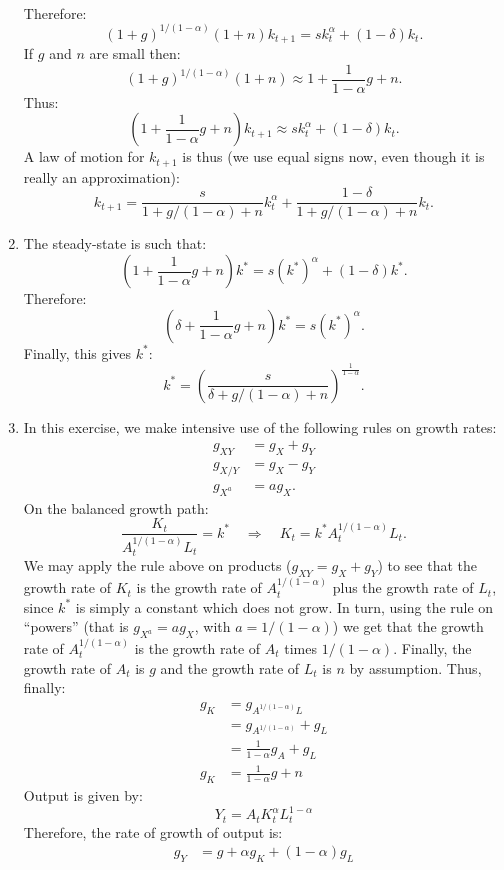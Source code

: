 \documentclass[]{book}
\theoremstyle{definition}
\theoremstyle{definition}
\theoremstyle{definition}
\theoremstyle{remark}
\begin{document}
\begin{enumerate}
\[\begin{aligned}
  \end{aligned}
  \] Therefore:
  \[(1+g)^{1/(1-\alpha)}(1+n) k_{t+1} =sk_t^\alpha+(1-\delta)k_t.\] If
  \(g\) and \(n\) are small then:
  \[(1+g)^{1/(1-\alpha)}(1+n)\approx1+\frac{1}{1-\alpha}g+n.\] Thus:
  \[\left(1+\frac{1}{1-\alpha}g+n\right)k_{t+1}\approx s k_t^\alpha+(1-\delta)k_t.\]
  A law of motion for \(k_{t+1}\) is thus (we use equal signs now, even
  though it is really an approximation):
  \[\boxed{k_{t+1}=\frac{s}{1+g/(1-\alpha)+n}k_t^{\alpha}+\frac{1-\delta}{1+g/(1-\alpha)+n}k_t}.\]
\item
  The steady-state is such that:
  \[\left(1+\frac{1}{1-\alpha}g+n\right)k^{*} = s(k^{*})^\alpha + (1-\delta)k^{*}.\]
  Therefore:
  \[\left(\delta+\frac{1}{1-\alpha}g+n\right)k^{*} = s(k^{*})^\alpha.\]
  Finally, this gives \(k^{*}\):
  \[\boxed{k^{*}=\left(\frac{s}{\delta+g/(1-\alpha)+n}\right)^{\frac{1}{1-\alpha}}}.\]
\item
  In this exercise, we make intensive use of the following rules on
  growth rates: \[
  \begin{aligned}
  g_{XY}&=g_X+g_Y\\
  g_{X/Y}&=g_X-g_Y\\
  g_{X^a}&=ag_X.
  \end{aligned}
  \] On the balanced growth path:
  \[\frac{K_t}{A_t^{1/(1-\alpha)} L_t}=k^{*} \quad \Rightarrow \quad K_t = k^{*}A_t^{1/(1-\alpha)} L_t.\]
  We may apply the rule above on products (\(g_{XY}=g_X+g_Y\)) to see
  that the growth rate of \(K_t\) is the growth rate of
  \(A_t^{1/(1-\alpha)}\) plus the growth rate of \(L_t\), since
  \(k^{*}\) is simply a constant which does not grow. In turn, using the
  rule on ``powers'' (that is \(g_{X^a}=ag_X\), with \(a=1/(1-\alpha)\))
  we get that the growth rate of \(A_t^{1/(1-\alpha)}\) is the growth
  rate of \(A_t\) times \(1/(1-\alpha)\). Finally, the growth rate of
  \(A_t\) is \(g\) and the growth rate of \(L_t\) is \(n\) by
  assumption. Thus, finally: \[
  \begin{aligned}
  g_K &=g_{A^{1/(1-\alpha)}L}\\
  &=g_{A^{1/(1-\alpha)}} + g_L\\
  &=\frac{1}{1-\alpha}g_A + g_L\\
  g_K &=\frac{1}{1-\alpha}g + n
  \end{aligned}
  \] Output is given by: \[Y_t=A_t K_t^{\alpha} L_t^{1-\alpha}\]
  Therefore, the rate of growth of output is: \[
  \begin{aligned}
  g_Y &= g + \alpha g_K +(1-\alpha)g_L\\

\end{aligned}\]
\end{enumerate}
\end{document}
